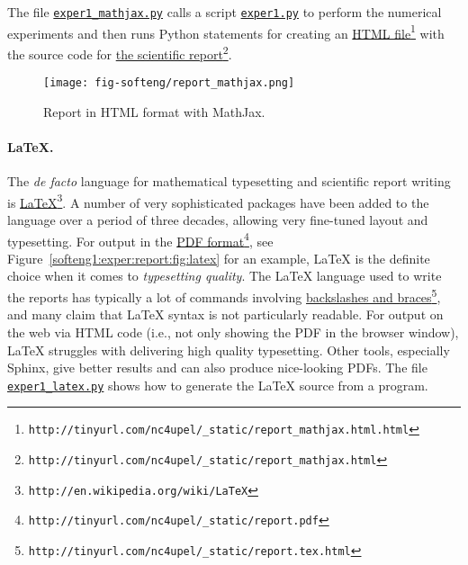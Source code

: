\documentclass[graybox,sectrefs,envcountresetchap,open=right,final]{svmonodo}
\begin{document}
The file \href{{http://tinyurl.com/p96acy2/report_generation/exper1_html.py}}{\nolinkurl{exper1_mathjax.py}}
calls a script
\href{{http://tinyurl.com/p96acy2/exper1.py}}{\nolinkurl{exper1.py}}
to perform the numerical experiments and then runs Python
statements for creating an \href{{http://tinyurl.com/nc4upel/_static/report_mathjax.html.html}}{HTML file}\footnote{\texttt{http://tinyurl.com/nc4upel/\_static/report\_mathjax.html.html}} with the source code for \href{{http://tinyurl.com/nc4upel/_static/report_mathjax.html}}{the scientific report}\footnote{\texttt{http://tinyurl.com/nc4upel/\_static/report\_mathjax.html}}.

\begin{figure}[!ht]  %
  \centerline{\texttt{[image: fig-softeng/report\_mathjax.png]}}
  \caption{
  Report in HTML format with MathJax. \label{softeng1:exper:report:fig:mathjax}
  }
\end{figure}


\paragraph{{\LaTeX}.}

The \emph{de facto} language for mathematical typesetting and scientific
report writing is \href{{http://en.wikipedia.org/wiki/LaTeX}}{LaTeX}\footnote{\texttt{http://en.wikipedia.org/wiki/LaTeX}}. A
number of very sophisticated packages have been added to the language
over a period of three decades, allowing very fine-tuned layout and
typesetting. For output in the \href{{http://tinyurl.com/nc4upel/_static/report.pdf}}{PDF format}\footnote{\texttt{http://tinyurl.com/nc4upel/\_static/report.pdf}}, see Figure~\ref{softeng1:exper:report:fig:latex} for an example, {\LaTeX} is the
definite choice when it comes to \emph{typesetting quality}.
The {\LaTeX} language used to
write the reports has typically a lot of commands involving
\href{{http://tinyurl.com/nc4upel/_static/report.tex.html}}{backslashes and braces}\footnote{\texttt{http://tinyurl.com/nc4upel/\_static/report.tex.html}}, and many claim that
{\LaTeX} syntax is not particularly readable.  For output on the web via
HTML code (i.e., not only showing the PDF in the browser window), {\LaTeX}
struggles with delivering high quality typesetting. Other tools,
especially Sphinx, give better results and can also produce
nice-looking PDFs.  The file \href{{http://tinyurl.com/p96acy2/report_generation/exper1_latex.py}}{\nolinkurl{exper1_latex.py}} shows how to
generate the {\LaTeX} source from a program.
\end{document}
